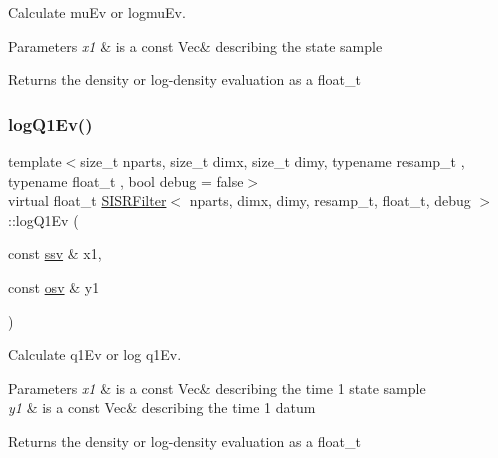 Calculate mu\+Ev or logmu\+Ev. 


\begin{DoxyParams}{Parameters}
{\em x1} & is a const Vec\& describing the state sample \\
\hline
\end{DoxyParams}
\begin{DoxyReturn}{Returns}
the density or log-\/density evaluation as a float\+\_\+t 
\end{DoxyReturn}
\mbox{\label{classSISRFilter_a4088dd5a2df7a7c7c9f1b41cda74c73d}} 
\subsubsection{\texorpdfstring{log\+Q1\+Ev()}{logQ1Ev()}}
{\footnotesize\ttfamily template$<$size\+\_\+t nparts, size\+\_\+t dimx, size\+\_\+t dimy, typename resamp\+\_\+t , typename float\+\_\+t , bool debug = false$>$ \\
virtual float\+\_\+t \hyperlink{classSISRFilter}{S\+I\+S\+R\+Filter}$<$ nparts, dimx, dimy, resamp\+\_\+t, float\+\_\+t, debug $>$\+::log\+Q1\+Ev (\begin{DoxyParamCaption}\item[{const \hyperlink{classSISRFilter_ada0fdfca451ed6a22a8bba48a881819d}{ssv} \&}]{x1,  }\item[{const \hyperlink{classSISRFilter_a42325662bf3d057ccc3eaa75fa2f70f9}{osv} \&}]{y1 }\end{DoxyParamCaption})\hspace{0.3cm}{\ttfamily [pure virtual]}}



Calculate q1\+Ev or log q1\+Ev. 


\begin{DoxyParams}{Parameters}
{\em x1} & is a const Vec\& describing the time 1 state sample \\
\hline
{\em y1} & is a const Vec\& describing the time 1 datum \\
\hline
\end{DoxyParams}
\begin{DoxyReturn}{Returns}
the density or log-\/density evaluation as a float\+\_\+t 
\end{DoxyReturn}
\mbox{\label{classSISRFilter_ab6a1715a4d8e713d15e8688d40bc6acf}} 
